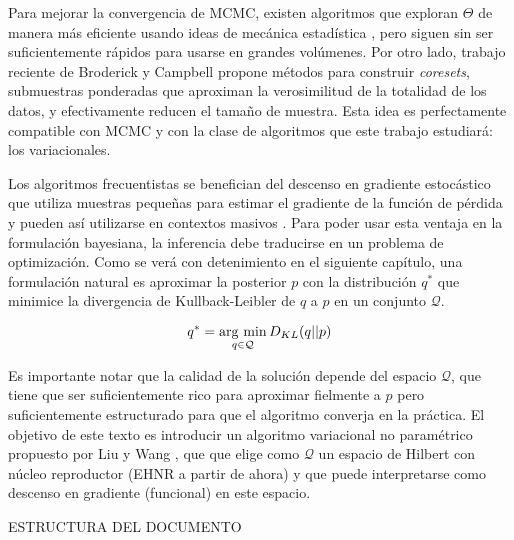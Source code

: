 \documentclass[main.tex]{subfiles}
\begin{document}
Para mejorar la convergencia de MCMC, existen algoritmos que exploran $\Theta$ de manera más eficiente usando ideas de mecánica estadística \cite{betancourt-hmc}, pero siguen sin ser suficientemente rápidos para usarse en grandes volúmenes. Por otro lado, trabajo reciente de Broderick y Campbell \cite{coresets, coresets-greedy} propone métodos para construir \textit{coresets}, submuestras ponderadas que aproximan la verosimilitud de la totalidad de los datos, y efectivamente reducen el tamaño de muestra. Esta idea es perfectamente compatible con MCMC y con la clase de algoritmos que este trabajo estudiará: los variacionales.

Los algoritmos frecuentistas se benefician del descenso en gradiente estocástico que utiliza muestras pequeñas para estimar el gradiente de la función de pérdida y pueden así utilizarse en contextos masivos \cite{goodfellow}. Para poder usar esta ventaja en la formulación bayesiana, la inferencia debe traducirse en un problema de optimización. Como se verá con detenimiento en el siguiente capítulo, una formulación natural es aproximar la posterior $p$ con la distribución $q^*$ que minimice la divergencia de Kullback-Leibler de $q$ a $p$ en un conjunto $\mathcal{Q}$. 

\begin{equation}
	q^* = \operatorname*{arg\,\min}_{q \in \mathcal{Q}} D_{KL}(q || p)
	\label{eqn:vi}	
\end{equation}

Es importante notar que la calidad de la solución depende del espacio $\mathcal{Q}$, que tiene que ser suficientemente rico para aproximar fielmente a $p$ pero suficientemente estructurado para que el algoritmo converja en la práctica. El objetivo de este texto es introducir un algoritmo variacional no paramétrico propuesto por Liu y Wang \cite{svgd}, que que elige como $\mathcal{Q}$ un espacio de Hilbert con núcleo reproductor (EHNR a partir de ahora) y que puede interpretarse como descenso en gradiente (funcional) en este espacio.

{\color{red} ESTRUCTURA DEL DOCUMENTO}
\end{document}
